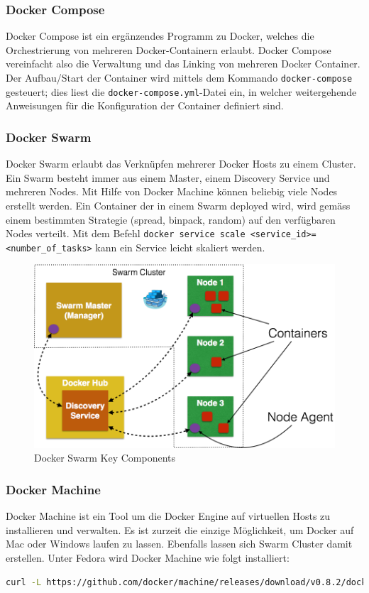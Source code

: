 \subsubsection{Docker Compose}
Docker Compose ist ein ergänzendes Programm zu Docker, welches die Orchestrierung von mehreren Docker-Containern erlaubt. Docker Compose vereinfacht also die Verwaltung und das Linking von mehreren Docker Container. Der Aufbau/Start der Container wird mittels dem Kommando \lstinline|docker-compose| gesteuert; dies liest die \lstinline|docker-compose.yml|-Datei ein, in welcher weitergehende Anweisungen für die Konfiguration der Container definiert sind.

\subsubsection{Docker Swarm}
Docker Swarm erlaubt das Verknüpfen mehrerer Docker Hosts zu einem Cluster. Ein Swarm besteht immer aus einem Master, einem Discovery Service und mehreren Nodes. Mit Hilfe von Docker Machine können beliebig viele Nodes erstellt werden. Ein Container der in einem Swarm deployed wird, wird gemäss einem bestimmten Strategie (spread, binpack, random) auf den verfügbaren Nodes verteilt. Mit dem Befehl \lstinline[]|docker service scale <service_id>=<number_of_tasks>| kann ein Service leicht skaliert werden.

\begin{figure}[h]
	\centering
	\includegraphics[width=0.5\linewidth]{appendix/docker/docker-swarm-cluster}
	\caption{Docker Swarm Key Components}
	\label{fig:docker-swarm-cluster}
\end{figure}

\subsubsection{Docker Machine}
Docker Machine ist ein Tool um die Docker Engine auf virtuellen Hosts zu installieren und verwalten. Es ist zurzeit die einzige Möglichkeit, um Docker auf Mac oder Windows laufen zu lassen. Ebenfalls lassen sich Swarm Cluster damit erstellen. Unter Fedora wird Docker Machine wie folgt installiert:
\begin{lstlisting}[language=bash]
curl -L https://github.com/docker/machine/releases/download/v0.8.2/docker-machine-`uname -s`-`uname -m` >/usr/local/bin/docker-machine && \ chmod +x /usr/local/bin/docker-machine
\end{lstlisting}

